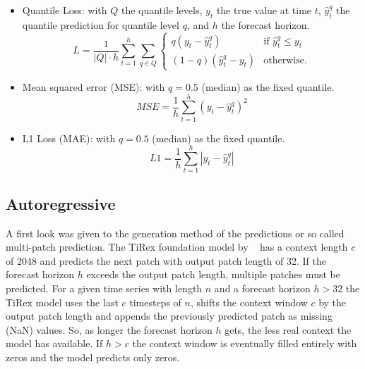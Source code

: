 \documentclass[a4paper,oneside,10pt,ngerman,english]{scrartcl}
\begin{document}
\begin{itemize}[]
	\item Quantile Loss: with $Q$ the quantile levels, $y_t$ the true value at time $t$, $\hat{y}_t^q$ the quantile prediction for quantile level $q$, and $h$ the forecast horizon.
	\begin{equation}
		L = \frac{1}{|Q| \cdot h} \sum_{t=1}^{h} \sum_{q \in Q} 
		\begin{cases} 
			q (y_t - \hat{y}_t^q) & \text{if } \hat{y}_t^q \le y_t \\
			(1 - q) (\hat{y}_t^q - y_t) & \text{otherwise.}
		\end{cases}
	\label{eq:quantile_loss}
	\end{equation}

	\item Mean squared error (MSE): with $q=0.5$ (median) as the fixed quantile.
	\begin{equation}
		MSE = \frac{1}{h} \sum_{t=1}^{h} (y_t - \hat{y}_t^q)^2
	\end{equation}	
	
	\item L1 Loss (MAE): with $q=0.5$ (median) as the fixed quantile.
	\begin{equation}
		L1 = \frac{1}{h} \sum_{t=1}^{h}  |y_t - \hat{y}_t^q|
	\end{equation}	
\end{itemize}


\subsection{Autoregressive}
\label{sec:autoregressive}

A first look was given to the generation method of the predictions or so called multi-patch prediction. The TiRex foundation model by  \citeauthor{auer2025tirexzeroshotforecastinglong}~\cite{auer2025tirexzeroshotforecastinglong} has a context length $c$ of 2048 and predicts the next patch with output patch length of 32. If the forecast horizon $h$ exceeds the output patch length, multiple patches must be predicted. For a given time series with length $n$ and a forecast horizon $h>32$ the TiRex model uses the last $c$ timesteps of $n$, shifts the context window $c$ by the output patch length and appends the previously predicted patch as missing (NaN) values. So, as longer the forecast horizon $h$ gets, the less real context the model has available. If $h>c$ the context window is eventually filled entirely with zeros and the model predicts only zeros.
\end{document}
